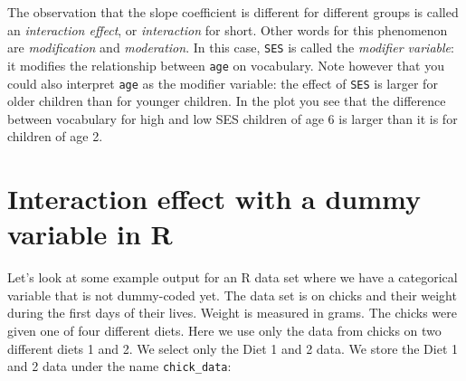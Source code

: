 \begin{knitrout}
\color{fgcolor}\begin{kframe}


{\ttfamily\noindent\bfseries{}}\end{kframe}
\end{knitrout}


The observation that the slope coefficient is different for different groups is called an \textit{interaction effect}, or \textit{interaction} for short. Other words for this phenomenon are \textit{modification} and \textit{moderation}. In this case, \texttt{SES} is called the \textit{modifier variable}: it modifies the relationship between \texttt{age} on vocabulary. Note however that you could also interpret \texttt{age} as the modifier variable: the effect of \texttt{SES} is larger for older children than for younger children. In the plot you see that the difference between vocabulary for high and low SES children of age 6 is larger than it is for children of age 2.







\section{Interaction effect with a dummy variable in R}

Let's look at some example output for an R data set where we have a categorical variable that is not dummy-coded yet. The data set is on chicks and their weight during the first days of their lives. Weight is measured in grams. The chicks were given one of four different diets. Here we use only the data from chicks on two different diets 1 and 2. We select only the Diet 1 and 2 data. We store the Diet 1 and 2 data under the name \texttt{chick\_data}:
 
 
\begin{knitrout}
\color{fgcolor}
\end{knitrout}




